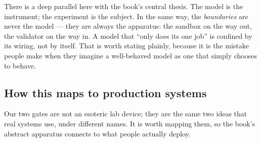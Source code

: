 There is a deep parallel here with the book's central thesis. The model
is the instrument; the experiment is the subject. In the same way, the
\emph{boundaries} are never the model --- they are always the apparatus:
the sandbox on the way out, the validator on the way in. A model that
``only does its one job'' is confined by its wiring, not by itself. That
is worth stating plainly, because it is the mistake people make when
they imagine a well-behaved model as one that simply chooses to behave.

\subsection{How this maps to production
systems}\label{how-this-maps-to-production-systems}

Our two gates are not an esoteric lab device; they are the same two
ideas that real systems use, under different names. It is worth mapping
them, so the book's abstract apparatus connects to what people actually
deploy.

